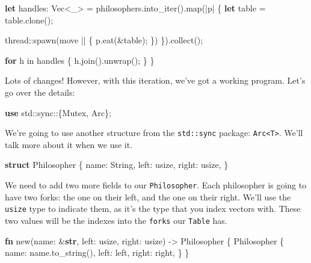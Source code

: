 \documentclass[a4paper,]{book}
\newenvironment{Shaded}{\begin{snugshade}}{\end{snugshade}}
\newcommand{\KeywordTok}[1]{\textcolor[rgb]{0.13,0.29,0.53}{\textbf{{#1}}}}
\newcommand{\NormalTok}[1]{{#1}}
\begin{document}
\begin{Shaded}
\begin{Highlighting}[]
    \KeywordTok{let} \NormalTok{handles: Vec<_> = philosophers.into_iter().map(|p| \{}
        \KeywordTok{let} \NormalTok{table = table.clone();}

        \NormalTok{thread::spawn(move || \{}
            \NormalTok{p.eat(&table);}
        \NormalTok{\})}
    \NormalTok{\}).collect();}

    \KeywordTok{for} \NormalTok{h in handles \{}
        \NormalTok{h.join().unwrap();}
    \NormalTok{\}}
\NormalTok{\}}
\end{Highlighting}
\end{Shaded}

Lots of changes! However, with this iteration, we've got a working
program. Let's go over the details:

\begin{Shaded}
\begin{Highlighting}[]
\KeywordTok{use} \NormalTok{std::sync::\{Mutex, Arc\};}
\end{Highlighting}
\end{Shaded}

We're going to use another structure from the \texttt{std::sync}
package: \texttt{Arc\textless{}T\textgreater{}}. We'll talk more about
it when we use it.

\begin{Shaded}
\begin{Highlighting}[]
\KeywordTok{struct} \NormalTok{Philosopher \{}
    \NormalTok{name: String,}
    \NormalTok{left: usize,}
    \NormalTok{right: usize,}
\NormalTok{\}}
\end{Highlighting}
\end{Shaded}

We need to add two more fields to our \texttt{Philosopher}. Each
philosopher is going to have two forks: the one on their left, and the
one on their right. We'll use the \texttt{usize} type to indicate them,
as it's the type that you index vectors with. These two values will be
the indexes into the \texttt{forks} our \texttt{Table} has.

\begin{Shaded}
\begin{Highlighting}[]
\KeywordTok{fn} \NormalTok{new(name: &}\KeywordTok{str}\NormalTok{, left: usize, right: usize) -> Philosopher \{}
    \NormalTok{Philosopher \{}
        \NormalTok{name: name.to_string(),}
        \NormalTok{left: left,}
        \NormalTok{right: right,}
    \NormalTok{\}}
\NormalTok{\}}
\end{Highlighting}
\end{Shaded}
\end{document}
